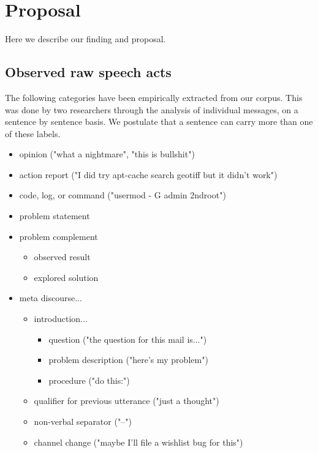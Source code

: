 \documentclass[11pt]{article}
\begin{document}
\section{Proposal}

Here we describe our finding and proposal.

\subsection{Observed raw speech acts}

The following categories have been empirically extracted from our corpus. This was done by two researchers through the analysis of individual messages, on a sentence by sentence basis. We postulate that a sentence can carry more than one of these labels.

\begin{itemize}
	\item opinion ("what a nightmare", "this is bullshit")
	\item action report ("I did try apt-cache search geotiff but it didn't work")
	\item code, log, or command ("usermod - G admin 2ndroot")
	\item problem statement
	\item problem complement
		\begin{itemize}
			\item observed result
			\item explored solution %
		\end{itemize}
	\item meta discourse...
		\begin{itemize}
			\item introduction...
				\begin{itemize}
					\item question ("the question for this mail is...")
					\item problem description ("here's my problem")
					\item procedure ("do this:")
				\end{itemize}
			\item qualifier for previous utterance ("just a thought")
			\item non-verbal separator ("--")
			\item channel change ("maybe I'll file a wishlist bug for this")

\end{itemize}
\end{itemize}
\end{document}
